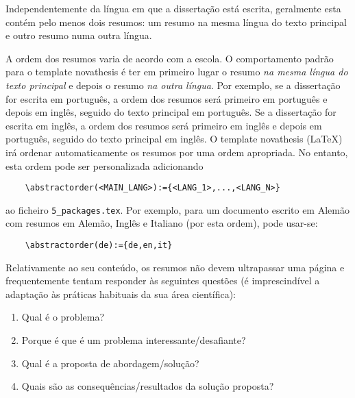 
%

Independentemente da língua em que a dissertação está escrita, geralmente esta contém pelo menos dois resumos: um resumo na mesma língua do texto principal e outro resumo numa outra língua.

A ordem dos resumos varia de acordo com a escola. O comportamento padrão para o template \gls{novathesis} é ter em primeiro lugar o resumo \emph{na mesma língua do texto principal} e depois o resumo \emph{na outra língua}. Por exemplo, se a dissertação for escrita em português, a ordem dos resumos será primeiro em português e depois em inglês, seguido do texto principal em português. Se a dissertação for escrita em inglês, a ordem dos resumos será primeiro em inglês e depois em português, seguido do texto principal em inglês.
%
O template \gls{novathesis} (\LaTeX) irá ordenar automaticamente os resumos por uma ordem apropriada. No entanto, esta ordem pode ser personalizada adicionando
\begin{verbatim}
    \abstractorder(<MAIN_LANG>):={<LANG_1>,...,<LANG_N>}
\end{verbatim}
\noindent ao ficheiro \verb!5_packages.tex!.  Por exemplo, para um documento escrito em Alemão com resumos em Alemão, Inglês e Italiano (por esta ordem), pode usar-se:
\begin{verbatim}
    \abstractorder(de):={de,en,it}
\end{verbatim}

Relativamente ao seu conteúdo, os resumos não devem ultrapassar uma página e frequentemente tentam responder às seguintes questões (é imprescindível a adaptação às práticas habituais da sua área científica):

\begin{enumerate}
  \item Qual é o problema?
  \item Porque é que é um problema interessante/desafiante?
  \item Qual é a proposta de abordagem/solução?
  \item Quais são as consequências/resultados da solução proposta?
\end{enumerate}

%
%

